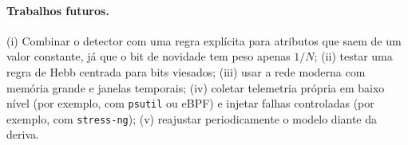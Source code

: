 \paragraph{Trabalhos futuros.} (i) Combinar o detector com uma regra explícita para atributos que saem de
um valor constante, já que o bit de novidade tem peso apenas $1/N$; (ii) testar uma regra de Hebb centrada para
bits viesados; (iii) usar a rede moderna com memória grande e janelas temporais; (iv) coletar telemetria própria
em baixo nível (por exemplo, com \texttt{psutil} ou eBPF) e injetar falhas controladas (por exemplo, com
\texttt{stress-ng}); (v) reajustar periodicamente o modelo diante da deriva.
